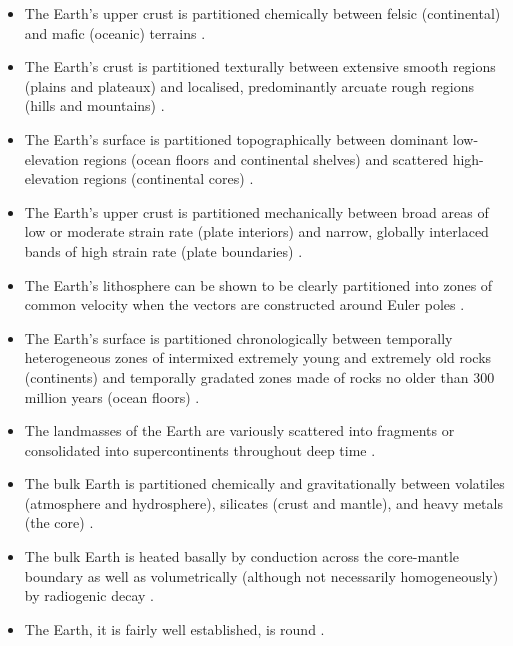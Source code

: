 \documentclass[a4paper,11pt,oneside]{book}
\begin{document}
\begin{itemize}
\item The Earth's upper crust is partitioned chemically between felsic (continental) and mafic (oceanic) terrains \cite{Lutgens2012-aa}.


\item The Earth's crust is partitioned texturally between extensive smooth regions (plains and plateaux) and localised, predominantly arcuate rough regions (hills and mountains) \cite{Van_Der_Linden1985-gm}.


\item The Earth's surface is partitioned topographically between dominant low-elevation regions (ocean floors and continental shelves) and scattered high-elevation regions (continental cores) \cite{De_Pater2015-sq}.


\item The Earth's upper crust is partitioned mechanically between broad areas of low or moderate strain rate (plate interiors) and narrow, globally interlaced bands of high strain rate (plate boundaries) \cite{Kearey2009-vq}.


\item The Earth's lithosphere can be shown to be clearly partitioned into zones of common velocity when the vectors are constructed around Euler poles \cite{De_Pater2015-sq}.


\item The Earth's surface is partitioned chronologically between temporally heterogeneous zones of intermixed extremely young and extremely old rocks (continents) and temporally gradated zones made of rocks no older than 300 million years (ocean floors) \cite{Coltice2012-si}.


\item The landmasses of the Earth are variously scattered into fragments or consolidated into supercontinents throughout deep time \cite{Wegener1924-pv}.


\item The bulk Earth is partitioned chemically and gravitationally between volatiles (atmosphere and hydrosphere), silicates (crust and mantle), and heavy metals (the core) \cite{Lodders1998-dj}.


\item The bulk Earth is heated basally by conduction across the core-mantle boundary as well as volumetrically (although not necessarily homogeneously) by radiogenic decay \cite{Turcotte2014-by}.


\item The Earth, it is fairly well established, is round \cite{Aristotle1939-dg}.
\end{itemize}
\end{document}
